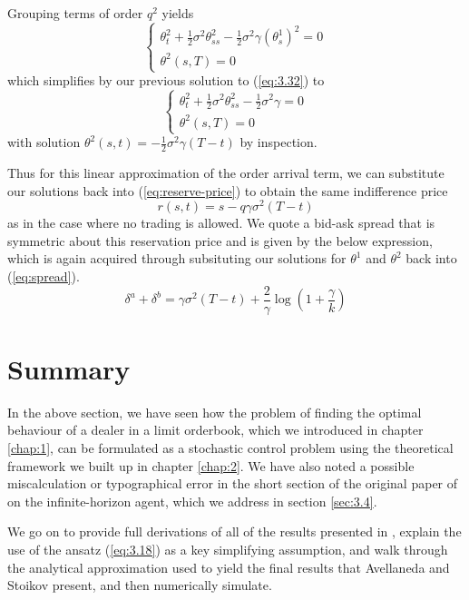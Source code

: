 Grouping terms of order $q^2$ yields
\begin{equation}
    \begin{cases}
        \theta^2_t+\frac{1}{2}\sigma^2\theta^2_{ss}-\frac{1}{2}\sigma^2\gamma(\theta^1_s)^2=0\\
        \theta^2(s,T)=0
    \end{cases}
\end{equation}
which simplifies by our previous solution to (\ref{eq:3.32}) to
\begin{equation*}
    \begin{cases}
        \theta^2_t+\frac{1}{2}\sigma^2\theta^2_{ss}-\frac{1}{2}\sigma^2\gamma=0\\
        \theta^2(s,T)=0
    \end{cases}
\end{equation*}
with solution $\theta^2(s,t)=-\frac{1}{2}\sigma^2\gamma(T-t)$ by inspection.

Thus for this linear approximation of the order arrival term, we can substitute our
solutions back into (\ref{eq:reserve-price}) to obtain the same indifference price
\begin{equation}
    r(s,t)=s-q\gamma\sigma^2(T-t)
\end{equation}
as in the case where no trading is allowed. We quote a bid-ask spread that is symmetric
about this reservation price and is given by the below expression, which is again acquired
through subsituting our solutions for $\theta^1$ and $\theta^2$ back into (\ref{eq:spread}).
\begin{equation}
    \delta^a+\delta^b=\gamma\sigma^2(T-t)+\frac{2}{\gamma}\log\left(1+\frac{\gamma}{k}\right)
\end{equation}

\section{Summary}\label{sec:3.9}

In the above section, we have seen how the problem of finding the optimal behaviour
of a dealer in a limit orderbook, which we introduced in chapter \ref{chap:1}, can be
formulated as a stochastic control problem using the theoretical framework we built up
in chapter \ref{chap:2}. We have also noted a possible miscalculation or typographical
error in the short section of the original paper of \cite{AS2008} on the infinite-horizon
agent, which we address in section \ref{sec:3.4}. 

We go on to provide full derivations of all of the results presented in \cite{AS2008},
explain the use of the ansatz (\ref{eq:3.18}) as a key simplifying assumption, and walk
through the analytical approximation used to yield the final results that Avellaneda
and Stoikov present, and then numerically simulate.